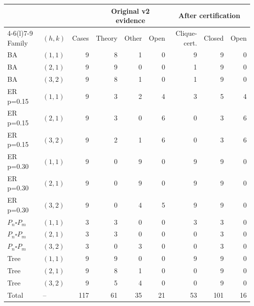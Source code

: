 \begin{tabular}{@{}llrrrrrrr@{}}
\toprule
& & & \multicolumn{3}{c}{Original v2 evidence} & \multicolumn{3}{c}{After certification}\\
\cmidrule(lr){4-6}\cmidrule(l){7-9}
Family & $(h,k)$ & Cases & Theory & Other & Open & Clique-cert. & Closed & Open\\
\midrule
BA & $(1,1)$ & 9 & 8 & 1 & 0 & 9 & 9 & 0\\
BA & $(2,1)$ & 9 & 9 & 0 & 0 & 1 & 9 & 0\\
BA & $(3,2)$ & 9 & 8 & 1 & 0 & 1 & 9 & 0\\
ER p=0.15 & $(1,1)$ & 9 & 3 & 2 & 4 & 3 & 5 & 4\\
ER p=0.15 & $(2,1)$ & 9 & 3 & 0 & 6 & 0 & 3 & 6\\
ER p=0.15 & $(3,2)$ & 9 & 2 & 1 & 6 & 0 & 3 & 6\\
ER p=0.30 & $(1,1)$ & 9 & 0 & 9 & 0 & 9 & 9 & 0\\
ER p=0.30 & $(2,1)$ & 9 & 0 & 9 & 0 & 9 & 9 & 0\\
ER p=0.30 & $(3,2)$ & 9 & 0 & 4 & 5 & 9 & 9 & 0\\
$P_n\square P_m$ & $(1,1)$ & 3 & 3 & 0 & 0 & 3 & 3 & 0\\
$P_n\square P_m$ & $(2,1)$ & 3 & 3 & 0 & 0 & 0 & 3 & 0\\
$P_n\square P_m$ & $(3,2)$ & 3 & 0 & 3 & 0 & 0 & 3 & 0\\
Tree & $(1,1)$ & 9 & 9 & 0 & 0 & 9 & 9 & 0\\
Tree & $(2,1)$ & 9 & 8 & 1 & 0 & 0 & 9 & 0\\
Tree & $(3,2)$ & 9 & 5 & 4 & 0 & 0 & 9 & 0\\
\midrule
Total & -- & 117 & 61 & 35 & 21 & 53 & 101 & 16\\
\bottomrule
\end{tabular}
